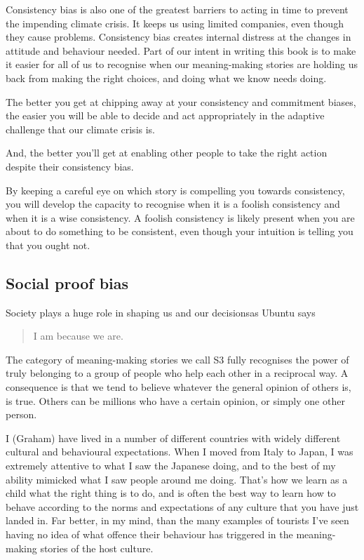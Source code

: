 Consistency bias is also one of the greatest barriers to acting in time to prevent the impending climate crisis. It keeps us using limited companies, even though they cause problems. Consistency bias creates internal distress at the changes in attitude and behaviour needed. Part of our intent in writing this book is to make it easier for all of us to recognise when our meaning\hyp{}making stories are holding us back from making the right choices, and doing what we know needs doing. 


The better you get at chipping away at your consistency and commitment biases, the easier you will be able to decide and act appropriately in the adaptive challenge that our climate crisis is.


And, the better you'll get at enabling other people to take the right action despite their consistency bias.


By keeping a careful eye on which story is compelling you towards consistency, you will develop the capacity to recognise when it is a foolish consistency and when it is a wise consistency. A foolish consistency is likely present when you are about to do something to be consistent, even though your intuition is telling you that you ought not. 
\subsection{Social proof bias}
\label{section:social-proof-bias}
Society plays a huge role in shaping us and our decisions\textemdash as Ubuntu says \begin{quote} I am because we are. \end{quote} The category of meaning\hyp{}making stories  we call S3 fully recognises the power of truly belonging to a group of people who help each other in a reciprocal way. A consequence is that we tend to believe whatever the general opinion of others is, is true. Others can be millions who have a certain opinion, or simply one other person.


\begin{longstoryblock}
I (Graham) have lived in a number of different countries with widely different cultural and behavioural expectations. When I moved from Italy to Japan, I was extremely attentive to what I saw the Japanese doing, and to the best of my ability mimicked what I saw people around me doing. That's how we learn as a child what the right thing is to do, and is often the best way to learn how to behave according to the norms and expectations of any culture that you have just landed in. Far better, in my mind, than the many examples of tourists I've seen having no idea of what offence their behaviour has triggered in the meaning\hyp{}making stories of the host culture.
\end{longstoryblock}


